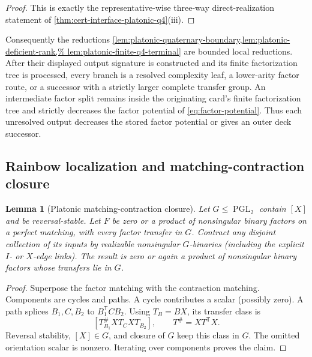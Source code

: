 \documentclass[11pt,letterpaper,onecolumn]{article}
\theoremstyle{plain}
\newtheorem{lemma}[lemma]{Lemma}
\theoremstyle{definition}
\theoremstyle{remark}
\newcommand{\PGL}{\operatorname{PGL}}
\begin{document}
\begin{proof}
This is exactly the representative-wise three-way direct-realization
statement of \cref{thm:cert-interface-platonic-q4}\textnormal{(iii)}.
\end{proof}

Consequently the reductions
\cref{lem:platonic-quaternary-boundary,lem:platonic-deficient-rank,%
lem:platonic-finite-q4-terminal} are bounded local reductions.  After their
displayed output signature is constructed and its finite factorization tree is
processed, every branch is a resolved complexity leaf, a lower-arity factor route, or
a successor with a strictly larger complete transfer group.  An intermediate factor split remains
inside the originating card's finite factorization tree and strictly decreases
the factor potential of \cref{eq:factor-potential}.  Thus each unresolved output decreases the stored factor potential or
gives an outer deck successor.

\subsection{Rainbow localization and matching-contraction closure}

\begin{lemma}[Platonic matching-contraction closure]
\label{lem:platonic-matching-contraction-closure}
Let \(G\le\PGL_2\) contain \([X]\) and be reversal-stable.  Let \(F\) be
zero or a product of nonsingular binary
factors on a perfect matching, with every factor transfer in \(G\).  Contract
any disjoint collection of its inputs by realizable nonsingular \(G\)-binaries
(including the explicit \(I\)- or \(X\)-edge links).  The result is zero or
again a product of nonsingular binary factors whose transfers lie in \(G\).
\end{lemma}

\begin{proof}
Superpose the factor matching with the contraction matching.  Components are
cycles and paths.  A cycle contributes a scalar (possibly zero). A path
splices \(B_1,C,B_2\) to \(B_1^{\mathsf T}CB_2\). Using \(T_B=BX\),
its transfer class is
\[
 [T_{B_1}^\#XT_CXT_{B_2}],\qquad T^\#=XT^{\mathsf T}X.
\]
Reversal stability, \([X]\in G\), and closure of \(G\) keep this class in
\(G\). The omitted orientation scalar is nonzero.  Iterating over
components proves the claim.
\end{proof}
\end{document}
